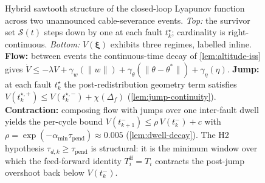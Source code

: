 \begin{figure}[t]
\caption{Hybrid sawtooth structure of the closed-loop Lyapunov
function across two unannounced cable-severance events.
\emph{Top:} the survivor set $\mathcal{S}(t)$ steps down by one
at each fault $t_k^\star$; cardinality is right-continuous.
\emph{Bottom:} $V(\boldsymbol{\xi})$ exhibits three regimes,
labelled inline. \textbf{Flow:} between events the continuous-time
decay of \cref{lem:altitude-iss} gives
$\dot V \le -\lambda V + \gamma_w(\|w\|) +
\gamma_\theta(\|\theta-\theta^\ast\|) + \gamma_\eta(\eta)$.
\textbf{Jump:} at each fault $t_k^\star$ the post-redistribution
geometry term satisfies
$V(t_k^{\star,+}) \le V(t_k^{\star,-}) + \chi(\Delta_f)$
(\cref{lem:jump-continuity}). \textbf{Contraction:} composing
flow with jumps over one inter-fault dwell yields the
per-cycle bound
$V(t_{k+1}^-) \le \rho\,V(t_k^-) + c$ with
$\rho = \exp(-\alpha_{\min}\tau_{\mathrm{pend}}) \approx 0.005$
(\cref{lem:dwell-decay}). The H2 hypothesis
$\tau_{d,k} \ge \tau_{\mathrm{pend}}$ is structural: it is the
minimum window over which the feed-forward identity
$T_i^{\mathrm{ff}} = T_i$ contracts the post-jump overshoot
back below $V(t_k^-)$.}
\label{fig:lyapunov-sawtooth}
\end{figure}
